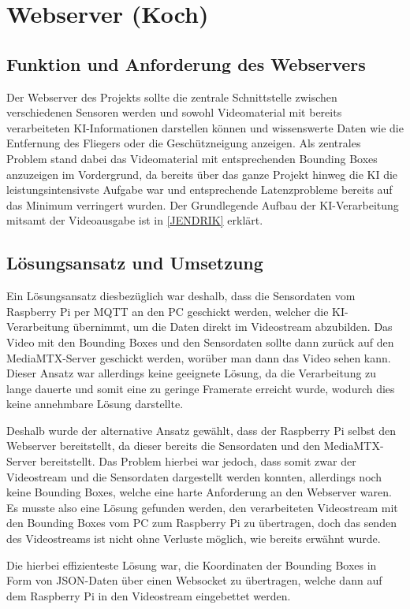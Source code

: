 \chapter{Webserver (Koch)}
\label{sec:Webserver}
\section{Funktion und Anforderung des Webservers}
Der Webserver des Projekts sollte die zentrale Schnittstelle zwischen verschiedenen Sensoren werden und sowohl Videomaterial mit bereits verarbeiteten KI-Informationen darstellen können und wissenswerte Daten wie die Entfernung des Fliegers oder die Geschützneigung anzeigen.
Als zentrales Problem stand dabei das Videomaterial mit entsprechenden Bounding Boxes anzuzeigen im Vordergrund, da bereits über das ganze Projekt hinweg die KI die leistungsintensivste Aufgabe war und entsprechende Latenzprobleme bereits auf das Minimum verringert wurden.
Der Grundlegende Aufbau der KI-Verarbeitung mitsamt der Videoausgabe ist in \ref{JENDRIK} erklärt.

\section{Lösungsansatz und Umsetzung}
Ein Lösungsansatz diesbezüglich war deshalb, dass die Sensordaten vom Raspberry Pi per MQTT an den PC geschickt werden, welcher die KI-Verarbeitung übernimmt, um die Daten direkt im Videostream abzubilden.
Das Video mit den Bounding Boxes und den Sensordaten sollte dann zurück auf den MediaMTX-Server geschickt werden, worüber man dann das Video sehen kann.
Dieser Ansatz war allerdings keine geeignete Lösung, da die Verarbeitung zu lange dauerte und somit eine zu geringe Framerate erreicht wurde, wodurch dies keine annehmbare Lösung darstellte.


Deshalb wurde der alternative Ansatz gewählt, dass der Raspberry Pi selbst den Webserver bereitstellt, da dieser bereits die Sensordaten und den MediaMTX-Server bereitstellt.
Das Problem hierbei war jedoch, dass somit zwar der Videostream und die Sensordaten dargestellt werden konnten, allerdings noch keine Bounding Boxes, welche eine harte Anforderung an den Webserver waren.
Es musste also eine Lösung gefunden werden, den verarbeiteten Videostream mit den Bounding Boxes vom PC zum Raspberry Pi zu übertragen, doch das senden des Videostreams ist nicht ohne Verluste möglich, wie bereits erwähnt wurde.

Die hierbei effizienteste Lösung war, die Koordinaten der Bounding Boxes in Form von JSON-Daten über einen Websocket zu übertragen, welche dann auf dem Raspberry Pi in den Videostream eingebettet werden.

